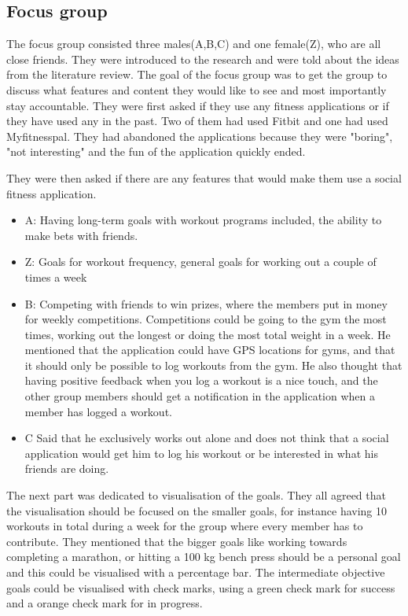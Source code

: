 \subsection{Focus group} \label{focusgroup}
The focus group consisted three males(A,B,C) and one female(Z), who are all close friends. They were introduced to the research and were told about the ideas from the literature review. The goal of the focus group was to get the group to discuss what features and content they would like to see and most importantly stay accountable.
They were first asked if they use any fitness applications or if they have used any in the past. Two of them had used Fitbit and one had used Myfitnesspal. They had abandoned the applications because they were "boring", "not interesting" and the fun of the application quickly ended.

They were then asked if there are any features that would make them use a social fitness application.
\begin{itemize}
\item A: Having long-term goals with workout programs included, the ability to make bets with friends.
\item Z: Goals for workout frequency, general goals for working out a couple of times a week 
\item B: Competing with friends to win prizes, where the members put in money for weekly competitions. Competitions could be going to the gym the most times, working out the longest or doing the most total weight in a week. He mentioned that the application could have GPS locations for gyms, and that it should only be possible to log workouts from the gym. He also thought that having positive feedback when you log a workout is a nice touch, and the other group members should get a notification in the application when a member has logged a workout.
\item C Said that he exclusively works out alone and does not think that a social application would get him to log his workout or be interested in what his friends are doing.
\end{itemize}

The next part was dedicated to visualisation of the goals. They all agreed that the visualisation should be focused on the smaller goals, for instance having 10 workouts in total during a week for the group where every member has to contribute.  They mentioned that the bigger goals like working towards completing a marathon, or hitting a 100 kg bench press should be a personal goal and this could be visualised with a percentage bar. The intermediate objective goals could be visualised with check marks, using a green check mark for success and a orange check mark for in progress.

